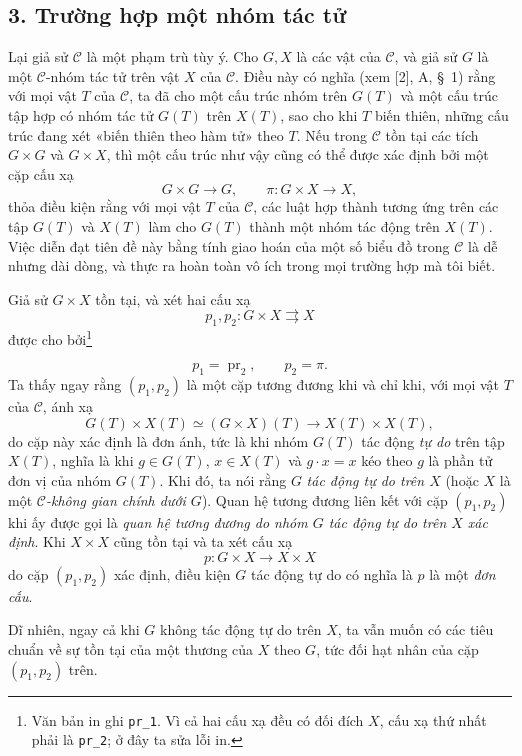 \documentclass[11pt,twoside,openany]{book}
\numberwithin{equation}{section}
\newcommand{\src}[1]{%
  \phantomsection\hypertarget{src:\fgasourceid:#1}{}%
  \marginpar{\raggedleft\footnotesize\sffamily #1}%
}
\newcommand{\fgasourceid}{unset}
\begin{document}
\subsection*{3. Trường hợp một nhóm tác tử}

Lại giả sử $\mathcal C$ là một phạm trù tùy ý. Cho $G,X$ là các vật của
$\mathcal C$, và giả sử $G$ là một $\mathcal C$-nhóm tác tử trên vật $X$ của
$\mathcal C$. Điều này có nghĩa (xem [2], A, \S~1) rằng với mọi vật $T$ của
$\mathcal C$, ta đã cho một cấu trúc nhóm trên $G(T)$ và một cấu trúc tập hợp
có nhóm tác tử $G(T)$ trên $X(T)$, sao cho khi $T$ biến thiên, những cấu trúc
đang xét «biến thiên theo hàm tử» theo $T$. Nếu trong $\mathcal C$ tồn tại các
tích $G\times G$ và $G\times X$, thì một cấu trúc như vậy cũng có thể được
xác định bởi một cặp cấu xạ
\[
  G\times G\longrightarrow G,
  \qquad \pi:G\times X\longrightarrow X,
\]
thỏa điều kiện rằng với mọi vật $T$ của $\mathcal C$, các luật hợp thành tương
ứng trên các tập $G(T)$ và $X(T)$ làm cho $G(T)$ thành một nhóm tác động trên
$X(T)$. Việc diễn đạt tiên đề này bằng tính giao hoán của một số biểu đồ trong
$\mathcal C$ là dễ nhưng dài dòng, và thực ra hoàn toàn vô ích trong mọi
trường hợp mà tôi biết.

Giả sử $G\times X$ tồn tại, và xét hai cấu xạ
\[
  p_1,p_2:G\times X\rightrightarrows X
\]
được cho bởi\footnote{Văn bản in ghi \texttt{pr\_1}. Vì cả hai cấu xạ đều có
đối đích $X$, cấu xạ thứ nhất phải là \texttt{pr\_2}; ở đây ta sửa lỗi in.}

\src{105}
\[
  p_1=\operatorname{pr}_2,\qquad p_2=\pi.
\]
Ta thấy ngay rằng $(p_1,p_2)$ là một cặp tương đương khi và chỉ khi, với mọi
vật $T$ của $\mathcal C$, ánh xạ
\[
  G(T)\times X(T)\simeq(G\times X)(T)
  \longrightarrow X(T)\times X(T),
\]
do cặp này xác định là đơn ánh, tức là khi nhóm $G(T)$ tác động
\emph{tự do} trên tập $X(T)$, nghĩa là khi $g\in G(T)$, $x\in X(T)$ và
$g\cdot x=x$ kéo theo $g$ là phần tử đơn vị của nhóm $G(T)$. Khi đó, ta nói
rằng $G$ \emph{tác động tự do trên $X$} (hoặc $X$ là một
\emph{$\mathcal C$-không gian chính dưới $G$}). Quan hệ tương đương liên kết
với cặp $(p_1,p_2)$ khi ấy được gọi là \emph{quan hệ tương đương do nhóm $G$
tác động tự do trên $X$ xác định}. Khi $X\times X$ cũng tồn tại và ta xét cấu
xạ
\[
  p:G\times X\longrightarrow X\times X
\]
do cặp $(p_1,p_2)$ xác định, điều kiện $G$ tác động tự do có nghĩa là $p$ là
một \emph{đơn cấu}.

Dĩ nhiên, ngay cả khi $G$ không tác động tự do trên $X$, ta vẫn muốn có các
tiêu chuẩn về sự tồn tại của một thương của $X$ theo $G$, tức đối hạt nhân của
cặp $(p_1,p_2)$ trên.
\end{document}
